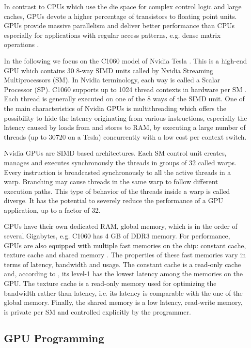 In contrast to CPUs which use the die space for complex control logic and large caches, GPUs devote a higher percentage of transistors to floating point units. GPUs provide massive parallelism and deliver better performance than CPUs especially for applications with regular access patterns, e.g. dense matrix operations \cite{vol2008}.

In the following we focus on the C1060 model of Nvidia Tesla \cite{lin2008}. This is a high-end GPU which contains 30 8-way SIMD units called by Nvidia Streaming Multiprocessors (SM). In Nvidia terminology, each way is called a Scalar Processor (SP). C1060 supports up to 1024 thread contexts in hardware per SM \cite{cuda}. Each thread is generally executed on one of the 8 ways of the SIMD unit. One of the main characteristics of Nvidia GPUs is multithreading which offers the possibility to hide the latency originating from various instructions, especially the latency caused by loads from and stores to RAM, by executing a large number of threads (up to 30720 on a Tesla) concurrently with a low cost per context switch.

Nvidia GPUs are SIMD based architectures. Each SM control unit creates, manages and executes synchronously the threads in groups of 32 called warps. Every instruction is broadcasted synchronously to all the active threads in a warp. Branching may cause threads in the same warp to follow different execution paths. This type of behavior of the threads inside a warp is called diverge. It has the potential to severely reduce the performance of a GPU application, up to a factor of 32.

GPUs have their own dedicated RAM, global memory, which is in the order of several Gigabytes, e.g. C1060 has 4 GB of DDR3 memory. For performance, GPUs are also equipped with multiple fast memories on the chip: constant cache, texture cache and shared memory \cite{ryo2008}. The properties of these fast memories vary in terms of latency, bandwidth and usage. The constant cache is a read-only cache and, according to \cite{won2010}, its level-1 has the lowest latency among the memories on the GPU. The texture cache is a read-only memory used for optimizing the bandwidth rather than latency, i.e. its latency is comparable with the one of the global memory. Finally, the shared memory is a low latency, read-write memory, is private per SM and controlled explicitly by the programmer.


\subsection{GPU Programming}

